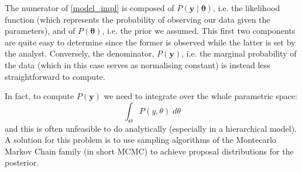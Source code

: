 The numerator of \ref{model_impl} is composed of $P(\bm{y} \; | \; \bm{\theta})$, i.e. the likelihood function (which represents the probability of observing our data given the parameters), and of $P(\bm{\theta})$, i.e. the prior we assumed. This first two components are quite easy to determine since the former is observed while the latter is set by the analyst. Conversely, the denominator, $P(\bm{y})$, i.e. the marginal probability of the data (which in this case serves as normalising constant) is instead less straightforward to compute.

In fact, to compute $P(\bm{y})$ we need to integrate over the whole parametric space: $$\int_{\Theta}P(y,\theta)\; d\theta$$ 
and this is often unfeasible to do analytically (especially in a hierarchical model). A solution for this problem is to use sampling algorithms of the Montecarlo Markov Chain family (in short MCMC) to achieve proposal distributions for the posterior.\\





